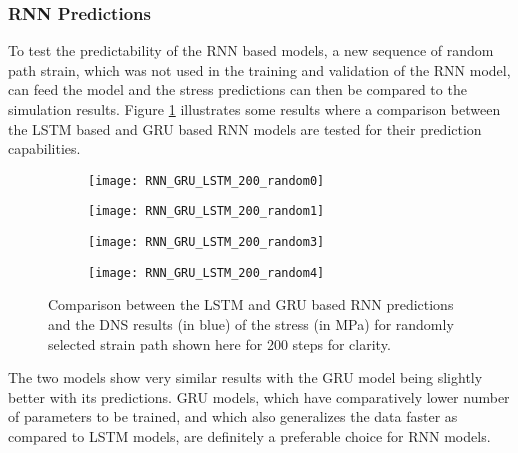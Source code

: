 \subsubsection{RNN Predictions} To test the predictability of the RNN based models, a new sequence of random path strain, which was not used in the training and validation of the RNN model, can feed the model and the stress predictions can then be compared to the simulation results. Figure \ref{fig-nn-rnn3} illustrates some results where a comparison between the LSTM based and GRU based RNN models are tested for their prediction capabilities. 

\begin{figure}
	\centering
	\begin{subfigure}[t]{0.45\textwidth}
		\texttt{[image: RNN\_GRU\_LSTM\_200\_random0]}
	\end{subfigure}
	\begin{subfigure}[t]{0.45\textwidth}
		\texttt{[image: RNN\_GRU\_LSTM\_200\_random1]}
	\end{subfigure}
	\begin{subfigure}[t]{0.45\textwidth}
		\texttt{[image: RNN\_GRU\_LSTM\_200\_random3]}
	\end{subfigure}
	\begin{subfigure}[t]{0.45\textwidth}
		\texttt{[image: RNN\_GRU\_LSTM\_200\_random4]}
	\end{subfigure}
	\caption{Comparison between the LSTM and GRU based RNN predictions and the DNS results (in blue) of the stress (in MPa) for randomly selected strain path shown here for 200 steps for clarity.}\label{fig-nn-rnn3}
\end{figure}

The two models show very similar results with the GRU model being slightly better with its predictions. GRU models, which have comparatively lower number of parameters to be trained, and which also generalizes the data faster as compared to LSTM models, are definitely a preferable choice for RNN models.

